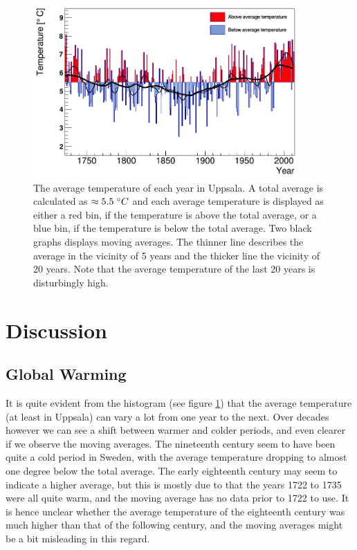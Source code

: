 \begin{figure}[H]
\centering
\includegraphics[width=0.9\textwidth]{global_warming.png}
\caption{\label{global_warming_figure} The average temperature of each year in Uppsala. A total average is calculated as $\approx 5.5 \hspace{1mm} ^\circ C$ and each average temperature is displayed as either a red bin, if the temperature is above the total average, or a blue bin, if the temperature is below the total average. Two black graphs displays moving averages. The thinner line describes the average in the vicinity of 5 years and the thicker line the vicinity of 20 years. Note that the average temperature of the last 20 years is disturbingly high. }
\end{figure}

\section{Discussion}

\subsection{Global Warming}

It is quite evident from the histogram (see figure \ref{global_warming_figure}) that the average temperature (at least in Uppsala) can vary a lot from one year to the next. Over decades however we can see a shift between warmer and colder periods, and even clearer if we observe the moving averages. The nineteenth century seem to have been quite a cold period in Sweden, with the average temperature dropping to almost one degree below the total average. The early eighteenth century may seem to indicate a higher average, but this is mostly due to that the years 1722 to 1735 were all quite warm, and the moving average has no data prior to 1722 to use. It is hence unclear whether the average temperature of the eighteenth century was much higher than that of the following century, and the moving averages might be a bit misleading in this regard.

